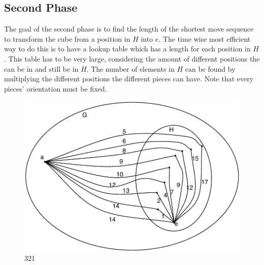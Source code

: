 \subsection{Second Phase}
\label{sub:secondPhase}
The goal of the second phase is to find the length of the shortest move sequence to transform the cube from a position in $H$ into $e$. The time wise most efficient way to do this is to have a lookup table which has a length for each position in $H$. This table has to be very large, considering the amount of different positions the \rubik{} can be in and still be in $H$. The number of elements in $H$ can be found by multiplying the different positions the different pieces can have. Note that every pieces' orientation must be fixed.

\begin{figure}[htb]
	\centering
		\includegraphics{input/pics/kocieambe2.pdf}
	\caption{321}
	\label{fig:kocieambe2}
\end{figure}
